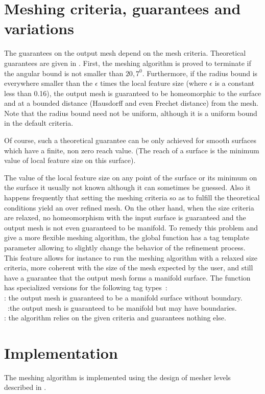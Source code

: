 \section{Meshing criteria, guarantees and variations}
\label{SurfaceMesher_section_criteria}
\label{SurfaceMesher_section_variations}

The guarantees on the output mesh depend on the mesh criteria.
Theoretical guarantees are given in \cite{Oudot-and-co}.
First, the meshing algorithm is proved to terminate 
if the angular bound is
not smaller than $20,7^0$. 
Furthermore, if the radius bound is everywhere smaller than 
the $\epsilon$ times the local feature size  (where $\epsilon$ is a constant
less than 0.16),  the output mesh 
is guaranteed to be homeomorphic to the surface
and at a bounded distance (Hausdorff and even Frechet distance)
from the mesh.
Note that the radius bound need not be uniform,
although it is a uniform bound in the default criteria.

Of course, such a theoretical guarantee can be only achieved
for smooth surfaces which have a finite, non zero
reach value. (The reach of a surface is the minimum value of local feature size on
this surface).

The value of the local feature size on any point of the surface
or its minimum on the surface it usually not known
although it can sometimes be guessed. Also it happens frequently
that setting the meshing criteria so as to fulfill the theoretical
conditions yield an over refined mesh.
On the other hand, when the size criteria are relaxed,
no homeomorphism with the input surface is guaranteed
and the output mesh is not even guaranteed to be manifold.
To remedy this problem and give a more flexible
meshing algorithm, the global function 
 has a tag template parameter
allowing to slightly change the behavior of the refinement process.
This feature allows for instance to run the meshing
algorithm with a relaxed size criteria, more coherent
with the size of the mesh expected by the user,
and still have a guarantee that
the output mesh forms a manifold surface.
The function  has specialized versions
for the following  tag types~: \\
 : the output mesh is guaranteed to be a manifold
surface without boundary.\\
~:the output mesh is guaranteed to be
manifold but may have boundaries.\\
 : the algorithm relies on the given criteria and
guarantees nothing else.

\section{Implementation}

The meshing algorithm is implemented using the design of mesher levels
described in \cite{Rineau-and-co}. 





